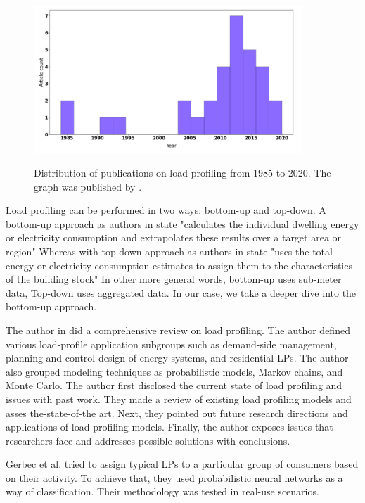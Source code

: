 \begin{figure}[H]
	\centering
	\caption{Distribution of publications on load profiling from 1985 to 2020. The graph was published by \protect\cite{Review2021}.}
	\includegraphics[width=0.9\textwidth]{Figures/publications.png}
	\label{fig:Distribution}
\end{figure}

Load profiling can be performed in two ways: bottom-up and top-down. 
A bottom-up approach as authors in \cite{SWAN20091819} state "calculates the individual dwelling energy or electricity consumption and extrapolates these results over a target area or region"
Whereas with top-down approach as authors in \cite{SWAN20091819} state "uses the total energy or electricity consumption estimates to assign them to the characteristics of the building stock"
In other more general words, bottom-up uses sub-meter data, Top-down uses aggregated data. 
In our case, we take a deeper dive into the bottom-up approach.

The author in \cite{Review2021} did a comprehensive review on load profiling. The author defined various load-profile application
subgroups such as demand-side management, planning and control design of energy systems, and residential LPs. The author also 
grouped modeling techniques as probabilistic models, Markov chains, and Monte Carlo. The author first disclosed the current state of load profiling and issues with past work.
They made a review of existing load profiling models
and asses the-state-of-the art. 
Next, they pointed out future research directions
and applications of load profiling models. Finally, the author exposes issues that researchers face and addresses possible solutions with conclusions.

Gerbec et al.\cite{GERBEC2005} tried to assign typical LPs to a particular group of consumers based on their activity. 
To achieve that, they used probabilistic neural networks as a way of classification. Their methodology was tested in real-use scenarios. 

